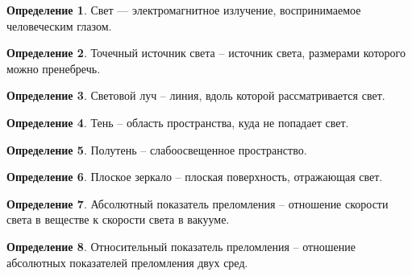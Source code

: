 \documentclass[12pt]{article}
\theoremstyle{definition}
\newtheorem{definition}{Определение}
\begin{document}
\begin{definition}
    Свет — электромагнитное излучение, воспринимаемое человеческим глазом.
\end{definition}
\begin{center}
\end{center}
\begin{definition}
    Точечный источник света -- источник света, размерами которого можно пренебречь.
\end{definition}
\begin{definition}
    Световой луч -- линия, вдоль которой рассматривается свет.
\end{definition}
\begin{definition}
    Тень -- область пространства, куда не попадает свет.
\end{definition}
\begin{definition}
    Полутень -- слабоосвещенное пространство.
\end{definition}
\begin{definition}
    Плоское зеркало -- плоская поверхность, отражающая свет.
\end{definition}
\begin{definition}
    Абсолютный показатель преломления -- отношение скорости света в веществе к скорости света в вакууме.
\end{definition}
\begin{definition}
    Относительный показатель преломления -- отношение абсолютных показателей преломления двух сред.
\end{definition}
\end{document}
